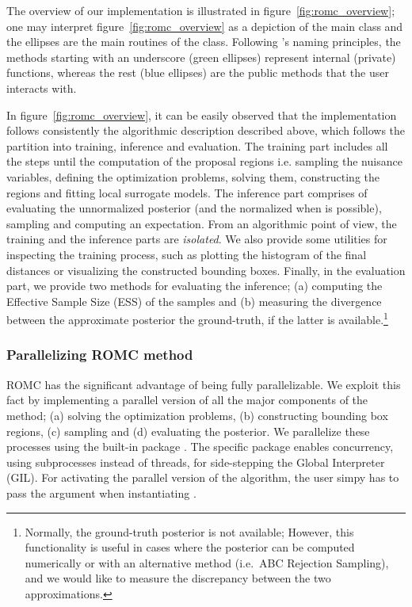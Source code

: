 

The overview of our implementation is illustrated in
figure~\ref{fig:romc_overview}; one may interpret
figure~\ref{fig:romc_overview} as a depiction of the main class and
the ellipses are the main routines of the class. Following
's naming principles, the methods starting with an
underscore (green ellipses) represent internal (private) functions,
whereas the rest (blue ellipses) are the public methods that the user
interacts with.



In figure~\ref{fig:romc_overview}, it can be easily observed that the
implementation follows consistently the algorithmic description
described above, which follows the partition into training, inference
and evaluation. The training part includes all the steps until the
computation of the proposal regions i.e. sampling the nuisance
variables, defining the optimization problems, solving them,
constructing the regions and fitting local surrogate models. The
inference part comprises of evaluating the unnormalized posterior (and
the normalized when is possible), sampling and computing an
expectation. From an algorithmic point of view, the training and the
inference parts are \emph{isolated}. We also provide some utilities
for inspecting the training process, such as plotting the histogram of
the final distances or visualizing the constructed bounding
boxes. Finally, in the evaluation part, we provide two methods for
evaluating the inference; (a) computing the Effective Sample Size
(ESS) of the samples and (b) measuring the divergence between the
approximate posterior the ground-truth, if the latter is
available.\footnote{Normally, the ground-truth posterior is not
  available; However, this functionality is useful in cases where the
  posterior can be computed numerically or with an alternative method
  (i.e.\ ABC Rejection Sampling), and we would like to measure the
  discrepancy between the two approximations.}

\subsubsection*{Parallelizing ROMC method}

ROMC has the significant advantage of being fully parallelizable. We
exploit this fact by implementing a parallel version of all the major
components of the method; (a) solving the optimization problems, (b)
constructing bounding box regions, (c) sampling and (d) evaluating the
posterior. We parallelize these processes using the built-in
 package . The specific package
enables concurrency, using subprocesses instead of threads, for
side-stepping the Global Interpreter (GIL). For activating the
parallel version of the algorithm, the user simpy has to pass the
argument  when instantiating .

